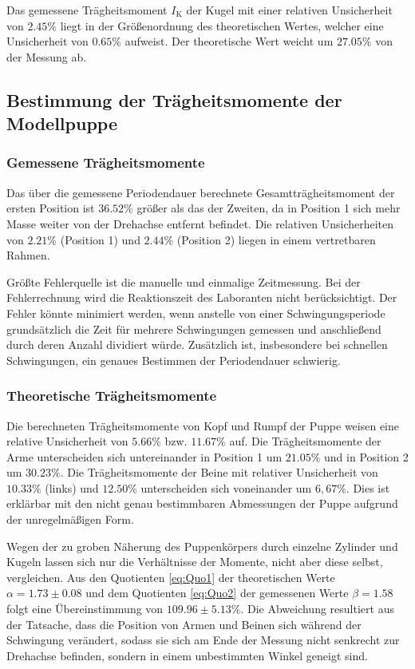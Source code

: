 Das gemessene Trägheitsmoment $I{_\text{K}}$ der Kugel mit einer relativen Unsicherheit von $2.45\%$ liegt in der Größenordnung des theoretischen Wertes, welcher eine Unsicherheit von $0.65\%$ aufweist. 
Der theoretische Wert weicht um $27.05\%$ von der Messung ab.

\subsection{Bestimmung der Trägheitsmomente der Modellpuppe}
\subsubsection{Gemessene Trägheitsmomente}
Das über die gemessene Periodendauer berechnete Gesamtträgheitsmoment der ersten Position ist $36.52\%$ größer als das der Zweiten, da in Position 1 sich mehr Masse weiter von der Drehachse entfernt befindet.
Die relativen Unsicherheiten von $2.21\%$ (Position 1) und $2.44\%$ (Position 2) liegen in einem vertretbaren Rahmen.

Größte Fehlerquelle ist die manuelle und einmalige Zeitmessung. 
Bei der Fehlerrechnung wird die Reaktionszeit des Laboranten nicht berücksichtigt. 
Der Fehler könnte minimiert werden, wenn anstelle von einer Schwingungsperiode grundsätzlich die Zeit für mehrere Schwingungen gemessen und anschließend durch deren Anzahl dividiert würde.
Zusätzlich ist, insbesondere bei schnellen Schwingungen, ein genaues Bestimmen der Periodendauer schwierig. 
\subsubsection{Theoretische Trägheitsmomente}
Die berechneten Trägheitsmomente von Kopf und Rumpf der Puppe weisen eine relative Unsicherheit von $5.66\%$ bzw. $11.67\%$ auf. 
Die Trägheitsmomente der Arme unterscheiden sich untereinander in Position 1 um $21.05\%$ und in Position 2 um $30.23\%$. 
Die Trägheitsmomente der Beine mit relativer Unsicherheit von $10.33\%$ (links) und $12.50\%$ unterscheiden sich voneinander um $6,67$\%. 
Dies ist erklärbar mit den nicht genau bestimmbaren Abmessungen der Puppe aufgrund der unregelmäßigen Form.

Wegen der zu groben Näherung des Puppenkörpers durch einzelne Zylinder und Kugeln lassen sich nur die Verhältnisse der Momente, nicht aber diese selbst, vergleichen.
Aus den Quotienten \eqref{eq:Quo1} der theoretischen Werte $\alpha=1.73\pm0.08$ und dem Quotienten \eqref{eq:Quo2} der gemessenen Werte $\beta=1.58$ folgt eine  Übereinstimmung von $109.96\pm5.13\%$. 
Die Abweichung resultiert aus der Tatsache, dass die Position von Armen und Beinen sich während der Schwingung verändert, sodass sie sich am Ende der Messung nicht senkrecht zur Drehachse befinden, sondern in einem unbestimmten Winkel geneigt sind.

